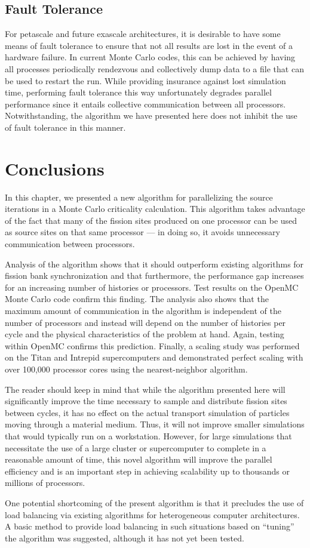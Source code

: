 \subsection{Fault Tolerance}

For petascale and future exascale architectures, it is desirable to have some
means of fault tolerance to ensure that not all results are lost in the event of
a hardware failure. In current Monte Carlo codes, this can be achieved by having
all processes periodically rendezvous and collectively dump data to a file that
can be used to restart the run. While providing insurance against lost
simulation time, performing fault tolerance this way unfortunately degrades
parallel performance since it entails collective communication between all
processors. Notwithstanding, the algorithm we have presented here does not
inhibit the use of fault tolerance in this manner.

\section{Conclusions}
\label{sec:conclusions}

In this chapter, we presented a new algorithm for parallelizing the source
iterations in a Monte Carlo criticality calculation. This algorithm takes
advantage of the fact that many of the fission sites produced on one processor
can be used as source sites on that same processor --- in doing so, it avoids
unnecessary communication between processors.

Analysis of the algorithm shows that it should outperform existing algorithms
for fission bank synchronization and that furthermore, the performance gap
increases for an increasing number of histories or processors. Test results on
the OpenMC Monte Carlo code confirm this finding. The analysis also shows that
the maximum amount of communication in the algorithm is independent of the
number of processors and instead will depend on the number of histories per
cycle and the physical characteristics of the problem at hand. Again, testing
within OpenMC confirms this prediction. Finally, a scaling study was performed
on the Titan and Intrepid supercomputers and demonstrated perfect scaling with
over 100,000 processor cores using the nearest-neighbor algorithm.

The reader should keep in mind that while the algorithm presented here will
significantly improve the time necessary to sample and distribute fission sites
between cycles, it has no effect on the actual transport simulation of particles
moving through a material medium. Thus, it will not improve smaller simulations
that would typically run on a workstation. However, for large simulations that
necessitate the use of a large cluster or supercomputer to complete in a
reasonable amount of time, this novel algorithm will improve the parallel
efficiency and is an important step in achieving scalability up to thousands or
millions of processors.

One potential shortcoming of the present algorithm is that it precludes the use
of load balancing via existing algorithms for heterogeneous computer
architectures. A basic method to provide load balancing in such situations based
on ``tuning'' the algorithm was suggested, although it has not yet been tested.
